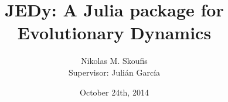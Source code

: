 \documentclass[a4paper,11pt]{article}
\begin{document}
\title{JEDy: A Julia package for Evolutionary Dynamics}
\author{Nikolas M. Skoufis \\ Supervisor: Julián García}
\date{October 24th, 2014}

\maketitle









    
\end{document}
